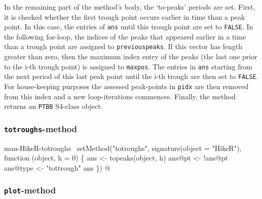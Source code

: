 \documentclass[a4paper]{article}
\begin{document}
In the remaining part of the method's body, the `to-peaks' periods are
set. First, it is checked whether the first trough point occurs
earlier in time than a peak point. In this case, the entries of
\verb?ans? until this trough point are set to \verb?FALSE?. In the following
for-loop, the indices of the peaks that appeared earlier in a time
than a trough point are assigned to \verb?previouspeaks?. If this vector
has length greater than zero, then the maximum index entry of the
peaks (the last one prior to the i-th trough point) is assigned to
\verb?maxpos?. The entries in \verb?ans? starting from the next period of
this last peak point until the i-th trough are then set to
\verb?FALSE?. For house-keeping purposes the assessed peak-points in
\verb?pidx? are then removed from this index and a new loop-iterations
commences. Finally, the method returns an \verb?PTBB? S4-class object.

\subsubsection{\texttt{totroughs}-method}

\nwenddocs{}\endmoddef
\LA{}man-HikeR-totroughs~{\nwtagstyle{}}\RA{}
setMethod("totroughs",
    signature(object = "HikeR"),
    function (object, h = 0) \{
        ans <- topeaks(object, h)
        ans@pt <- !ans@pt
        ans@type <- "tottrough"
        ans
\})
\nwendcode{}@

\subsubsection{\texttt{plot}-method}
\end{document}
